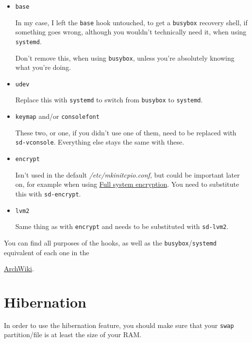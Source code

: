 \documentclass[9pt]{report}
\newenvironment{NOTE}
{\begin{tcolorbox}[colback=admonitionBG,coltitle=draculaFG,colframe=draculaBlue,colbacktitle=draculaBlue,title=NOTE]}
{\end{tcolorbox}}
\newenvironment{WARNING}
{\begin{tcolorbox}[colback=admonitionBG,coltitle=draculaBG,colframe=draculaOrange,colbacktitle=draculaOrange,title=WARNING]}
{\end{tcolorbox}}
\begin{document}
\begin{itemize}

    \item \texttt{base}

        In my case, I left the \texttt{base} hook untouched, to get a \texttt{busybox} recovery shell, if something goes wrong, although you wouldn’t technically need it, when using \texttt{systemd}.


        \begin{WARNING}
            Don’t remove this, when using \texttt{busybox}, unless you’re absolutely knowing what you’re doing.
        \end{WARNING}

    \item \texttt{udev}

        Replace this with \texttt{systemd} to switch from \texttt{busybox} to \texttt{systemd}.

    \item \texttt{keymap} and/or \texttt{consolefont}

        These two, or one, if you didn’t use one of them, need to be replaced with \texttt{sd-vconsole}.
        Everything else stays the same with these.

    \item \texttt{encrypt}

        Isn’t used in the default \textit{/etc/mkinitcpio.conf}, but could be important later on, for example when using \hyperlink{x-full-system-encryption}{Full system encryption}.
        You need to substitute this with \texttt{sd-encrypt}.

    \item \texttt{lvm2}

        Same thing as with \texttt{encrypt} and needs to be substituted with \texttt{sd-lvm2}.

\end{itemize}


\begin{NOTE}
    You can find all purposes of the hooks, as well as the \texttt{busybox}/\texttt{systemd} equivalent of each one in the

    \href{https://wiki.archlinux.org/index.php/Mkinitcpio#Common_hooks}{ArchWiki}.

\end{NOTE}

\newpage

\hypertarget{x-hibernation}{\section{Hibernation}}
In order to use the hibernation feature, you should make sure that your \texttt{swap} partition/file is at least the size of your RAM.
\end{document}
